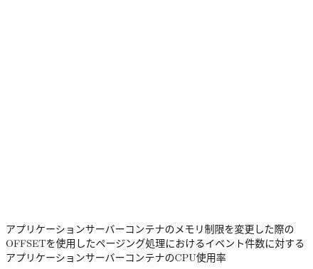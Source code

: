 \documentclass[../../../../../main]{subfiles}
\begin{document}
    \begin{figure}[H]
        \centering
        \includegraphics[width=12cm]{graph}
        \caption{アプリケーションサーバーコンテナのメモリ制限を変更した際のOFFSETを使用したページング処理におけるイベント件数に対するアプリケーションサーバーコンテナのCPU使用率}
        \label{fig:paging-offset-change-app-memory-limit-app-cpu-app_4_db_1_1024}
    \end{figure}
\end{document}
